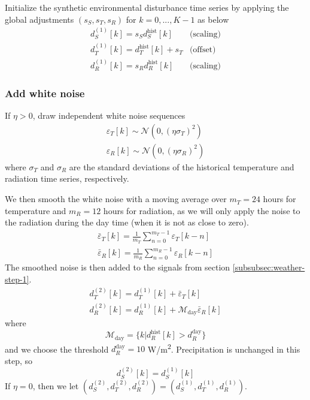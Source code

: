 \documentclass[preprint,12pt]{elsarticle}
\newcommand{\df}[2]{\displaystyle\frac{#1}{#2}}
\begin{document}
Initialize the synthetic environmental disturbance time series by applying the global adjustments $(s_{S}, s_{T}, s_{R})$ for $k=0,...,K-1$ as below
\begin{equation}
\begin{array}{ll}
d_{S}^{(1)}[k] = s_{S}d_{S}^{\text{hist}}[k]    & \text{(scaling)} \\[7pt]
d_{T}^{(1)}[k] = d_{T}^{\text{hist}}[k] + s_{T} & \text{(offset)}  \\[7pt]
d_{R}^{(1)}[k] = s_{R}d_{R}^{\text{hist}}[k]    & \text{(scaling)}
\end{array}
\label{eqn:global-scaling}
\end{equation}

\subsubsection{Add white noise}\label{subsubsec:weather-step-2}

If $\eta > 0$, draw independent white noise sequences
\begin{align}
\varepsilon_{T}[k] \sim \mathcal{N}(0, (\eta\sigma_{T})^{2}) \\
\varepsilon_{R}[k] \sim \mathcal{N}(0, (\eta\sigma_{R})^{2})
\label{eqn:varepsilon}
\end{align}
where $\sigma_{T}$ and $\sigma_{R}$ are the standard deviations of the historical temperature and radiation time series, respectively.

We then smooth the white noise with a moving average over $m_{T} = 24$ hours for temperature and $m_{R} = 12$ hours for radiation, as we will only apply the noise to the radiation during the day time (when it is not as close to zero).
\begin{align}
\bar{\varepsilon}_{T}[k] = \df{1}{m_{T}} \sum_{n=0}^{m_{T} - 1} \varepsilon_{T}[k-n] \\
\bar{\varepsilon}_{R}[k] = \df{1}{m_{R}} \sum_{n=0}^{m_{R} - 1} \varepsilon_{R}[k-n]
\label{eqn:smooth-noise}
\end{align}
The smoothed noise is then added to the signals from section \ref{subsubsec:weather-step-1}.
\begin{align}
d_{T}^{(2)}[k] = d_{T}^{(1)}[k] + \bar{\varepsilon}_{T}[k] \\
d_{R}^{(2)}[k] = d_{R}^{(1)}[k] + \mathcal{M}_{\text{day}}\bar{\varepsilon}_{R}[k]
\label{eqn:add-noise}
\end{align}
where
\begin{equation}
\mathcal{M}_{\text{day}} = \{ k | d_{R}^{\text{hist}}[k] > d_{R}^{\text{day}} \}
\label{eqn:daymask}
\end{equation}
and we choose the threshold $d_{R}^{\text{day}} = 10$ W/m\textsuperscript{2}. Precipitation is unchanged in this step, so
\begin{equation}
d_{S}^{(2)}[k] = d_{S}^{(1)}[k]
\label{eqn:P2-P1}
\end{equation}
If $\eta = 0$, then we let $(d_{S}^{(2)}, d_{T}^{(2)}, d_{R}^{(2)}) = (d_{S}^{(1)}, d_{T}^{(1)}, d_{R}^{(1)})$.
\end{document}
